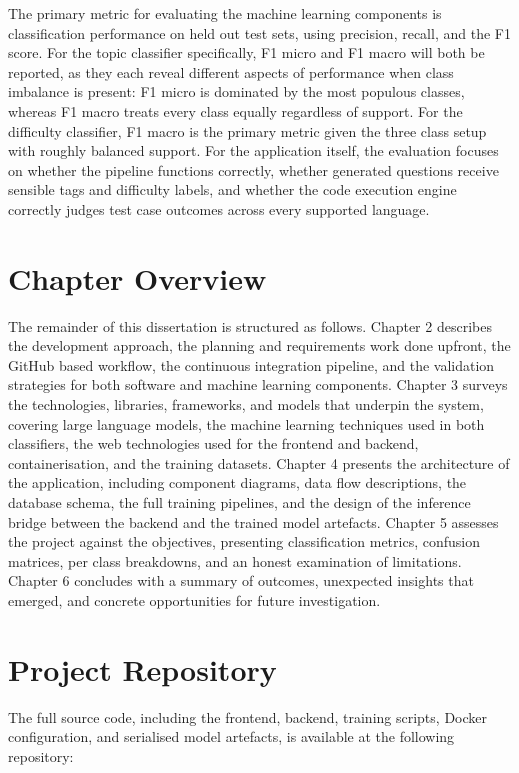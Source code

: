 The primary metric for evaluating the machine learning components is
classification performance on held out test sets, using precision, recall,
and the F1 score. For the topic classifier specifically, F1 micro and F1
macro will both be reported, as they each reveal different aspects of
performance when class imbalance is present: F1 micro is dominated by the
most populous classes, whereas F1 macro treats every class equally regardless
of support. For the difficulty classifier, F1 macro is the primary metric
given the three class setup with roughly balanced support. For the
application itself, the evaluation focuses on whether the pipeline functions
correctly, whether generated questions receive sensible tags and difficulty
labels, and whether the code execution engine correctly judges test case
outcomes across every supported language.

\section{Chapter Overview}

The remainder of this dissertation is structured as follows. Chapter
2 describes the development approach, the planning and requirements
work done upfront, the GitHub based workflow, the continuous
integration pipeline, and the validation strategies for both software
and machine learning components. Chapter 3 surveys the technologies,
libraries, frameworks, and models that underpin the system, covering
large language models, the machine learning techniques used in both
classifiers, the web technologies used for the frontend and backend,
containerisation, and the training datasets. Chapter 4 presents the
architecture of the application, including component diagrams, data
flow descriptions, the database schema, the full training pipelines,
and the design of the inference bridge between the backend and the
trained model artefacts. Chapter 5 assesses the project against the
objectives, presenting classification metrics, confusion matrices, per
class breakdowns, and an honest examination of limitations. Chapter 6
concludes with a summary of outcomes, unexpected insights that
emerged, and concrete opportunities for future investigation.

\section{Project Repository}

The full source code, including the frontend, backend, training
scripts, Docker configuration, and serialised model artefacts, is
available at the following repository:

